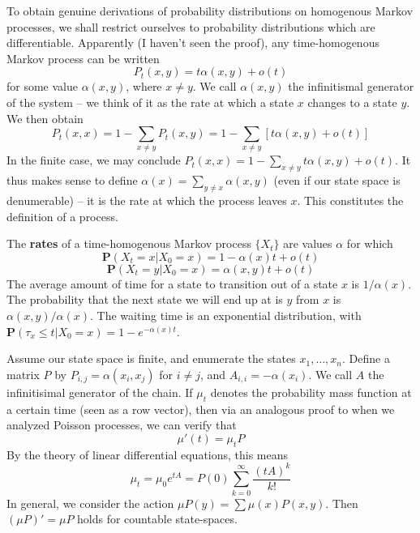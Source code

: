 To obtain genuine derivations of probability distributions on homogenous Markov processes, we shall restrict ourselves to probability distributions which are differentiable. Apparently (I haven't seen the proof), any time-homogenous Markov process can be written
%
\[ P_t(x,y) = t \alpha(x,y) + o(t) \]
%
for some value $\alpha(x,y)$, where $x \neq y$. We call $\alpha(x,y)$ the infinitismal generator of the system -- we think of it as the rate at which a state $x$ changes to a state $y$. We then obtain
%
\[ P_t(x,x) = 1 - \sum_{x \neq y} P_t(x,y) = 1 - \sum_{x \neq y} [t \alpha(x,y) + o(t)] \]
%
In the finite case, we may conclude $P_t(x,x) = 1 - \sum_{x \neq y} t \alpha(x,y) + o(t)$. It thus makes sense to define $\alpha(x) = \sum_{y \neq x} \alpha(x,y)$ (even if our state space is denumerable) -- it is the rate at which the process leaves $x$. This constitutes the definition of a process.

\begin{definition}
    The {\bf rates} of a time-homogenous Markov process $\{ X_t \}$ are values $\alpha$ for which
    \[ \mathbf{P}(X_t = x | X_0 = x) = 1 - \alpha(x) t + o(t) \]
    \[ \mathbf{P}(X_t = y | X_0 = x) = \alpha(x,y) t + o(t) \]
    The average amount of time for a state to transition out of a state $x$ is $1/\alpha(x)$. The probability that the next state we will end up at is $y$ from $x$ is $\alpha(x,y)/\alpha(x)$. The waiting time is an exponential distribution, with $\mathbf{P}(\tau_x \leq t | X_0 = x) = 1 - e^{-\alpha(x)t}$.
\end{definition}

Assume our state space is finite, and enumerate the states $x_1, \dots, x_n$. Define a matrix $P$ by $P_{i,j} = \alpha(x_i, x_j)$ for $i \neq j$, and $A_{i,i} = - \alpha(x_i)$. We call $A$ the infinitisimal generator of the chain. If $\mu_t$ denotes the probability mass function at a certain time (seen as a row vector), then via an analogous proof to when we analyzed Poisson processes, we can verify that
%
\[ \mu'(t) = \mu_t P \]
%
By the theory of linear differential equations, this means
%
\[ \mu_t = \mu_0 e^{tA} = P(0) \sum_{k = 0}^\infty \frac{(tA)^k}{k!} \]
%
In general, we consider the action $\mu P(y) = \sum \mu(x) P(x,y)$. Then $(\mu P)' = \mu P$ holds for countable state-spaces.

